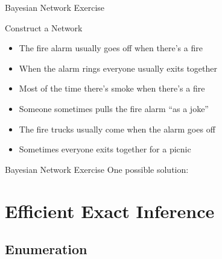 \documentclass[14pt]{beamer}
\begin{document}
\begin{frame}{Bayesian Network Exercise}
	\begin{block}{Construct a Network}
		\begin{itemize}
			\item The fire alarm usually goes off when there's a fire
			\item When the alarm rings everyone usually exits together
			\item Most of the time there's smoke when there's a fire
			\item Someone sometimes pulls the fire alarm ``as a joke''
			\item The fire trucks usually come when the alarm goes off
			\item Sometimes everyone exits together for a picnic
		\end{itemize}
	\end{block}
\end{frame}

\begin{frame}[label=network-exercise-solution]{Bayesian Network Exercise}
One possible solution:
\begin{center}
\end{center}
\end{frame}

\section{Efficient Exact Inference}

\subsection{Enumeration}
\end{document}
